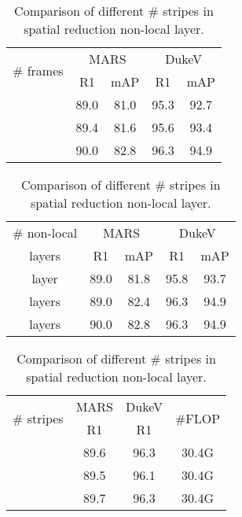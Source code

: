 \documentclass{bmvc2k}
\begin{document}
\begin{table}[t]
    \begin{minipage}{.5\linewidth}
      \centering
      \caption{Comparison of NVAN network with different \# frames of RRS strategy.}
        \begin{tabular}{c|cc|cc}
        \hline
        \multirow{2}{*}{\# frames}  & \multicolumn{2}{c|}{MARS} & \multicolumn{2}{c}{DukeV} \\
        \cline{2-5}
        & R1  & mAP & R1  & mAP      \\ 
        \hline \hline
            & 89.0       & 81.0      & 95.3     &  92.7    \\
            &  89.4      & 81.6      & 95.6  & 93.4 \\ 
           & 90.0      & 82.8      & 96.3       & 94.9  \\
\hline
     \end{tabular}
    \label{tab:T}
    \caption{Comparison of NVAN network with different \# non-local layers embedded.}
        \begin{tabular}{c|cc|cc}
        \hline
        \# non-local   & \multicolumn{2}{c|}{MARS} & \multicolumn{2}{c}{DukeV} \\
        \cline{2-5}
        layers & R1  & mAP & R1  & mAP      \\ 
        \hline \hline
         layer     & 89.0       & 81.8     &  95.8    & 93.7     \\
         layers    & 89.0      &  82.4      & 96.3  &  94.9\\ 
         layers   & 90.0      & 82.8      & 96.3      & 94.9  \\ 
        \hline
     \end{tabular}
    \label{tab:non}
    \end{minipage}\hspace{0.5mm}
    \begin{minipage}{.5\linewidth}
     \centering
      \caption{Comparison of different \# stripes in spatial reduction non-local layer.}
        \begin{tabular}{c|c|c|c}
        \hline
        \multirow{2}{*}{\# stripes}  & MARS & DukeV & \multirow{2}{*}{\#FLOP}  \\
        \cline{2-3}
        & R1  & R1 &     \\ 
        \hline \hline
                & 89.6    &  96.3  & 30.4G \\
                & 89.5    &  96.1  & 30.4G\\ 
                 & 89.7      & 96.3 & 30.4G\\

\end{tabular}
\end{minipage}
\end{table}
\end{document}
